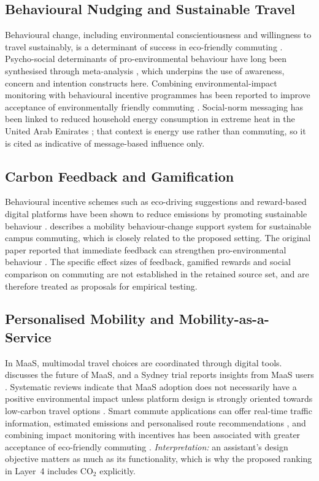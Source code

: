 \documentclass[11pt,a4paper]{article}
\begin{document}
\subsection{Behavioural Nudging and Sustainable Travel}
Behavioural change, including environmental conscientiousness and willingness to travel sustainably,
is a determinant of success in eco-friendly commuting \citep{eslami2025}. Psycho-social determinants
of pro-environmental behaviour have long been synthesised through meta-analysis
\citep{bamberg2007}, which underpins the use of awareness, concern and intention constructs here.
Combining environmental-impact monitoring with behavioural incentive programmes has been reported to
improve acceptance of environmentally friendly commuting \citep{eslami2025}. Social-norm messaging
has been linked to reduced household energy consumption in extreme heat in the United Arab Emirates
\citep{nisa2025}; that context is energy use rather than commuting, so it is cited as indicative of
message-based influence only.

\subsection{Carbon Feedback and Gamification}
Behavioural incentive schemes such as eco-driving suggestions and reward-based digital platforms have
been shown to reduce emissions by promoting sustainable behaviour \citep{niazi2024}. \citet{sunio2018}
describes a mobility behaviour-change support system for sustainable campus commuting, which is
closely related to the proposed setting. The original paper reported that immediate feedback can
strengthen pro-environmental behaviour \citep{nisa2025,sunio2018}. The specific effect sizes of
feedback, gamified rewards and social comparison on commuting are not established in the retained
source set, and are therefore treated as proposals for empirical testing.

\subsection{Personalised Mobility and Mobility-as-a-Service}
In MaaS, multimodal travel choices are coordinated through digital tools. \citet{hensher2024}
discusses the future of MaaS, and a Sydney trial reports insights from MaaS users \citep{smith2023}.
Systematic reviews indicate that MaaS adoption does not necessarily have a positive environmental
impact unless platform design is strongly oriented towards low-carbon travel options \citep{an2025}.
Smart commute applications can offer real-time traffic information, estimated emissions and
personalised route recommendations \citep{kashem2025,ouyang2025}, and combining impact monitoring with
incentives has been associated with greater acceptance of eco-friendly commuting \citep{eslami2025}.
\textit{Interpretation:} an assistant's design objective matters as much as its functionality, which
is why the proposed ranking in Layer~4 includes CO$_2$ explicitly.
\end{document}
